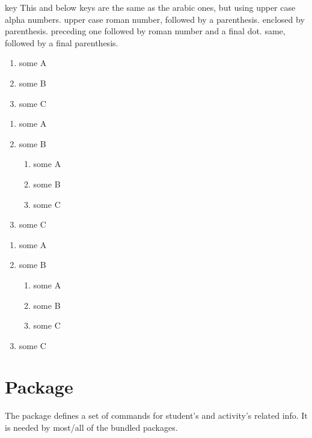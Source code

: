 \documentclass[article,nofontwarning,nogeometry,english,tocdepth=3,secdepth=3]{ufrgscca} %
\begin{document}
\begin{describelist}{key}
	 {This and below keys are the same as the arabic ones, but using upper case alpha numbers.}
	 {upper case roman number, followed by a parenthesis.}
	 {enclosed by parenthesis.}
	 {preceding one followed by roman number and a final dot.}
	 {same, followed by a final parenthesis.}
	\begin{codestore}[st=enumC]
	\begin{enumerate}
		\item some A
		\item some B
		\item some C
	\end{enumerate}
	\begin{enumerate}
		\item some A
		\item some B
		\begin{enumerate}
			\item some A
			\item some B
			\item some C
		\end{enumerate}
		\item some C
	\end{enumerate}
	\begin{enumerate}
		\item some A
		\item some B
		\begin{enumerate}
			\item some A
			\item some B
			\item some C
		\end{enumerate}
		\item some C
	\end{enumerate}
\end{codestore}



\end{describelist}




\section{ Package}
The  package defines a set of commands for  student's and activity's related info. It is needed by most/all of the bundled packages.
\end{document}
